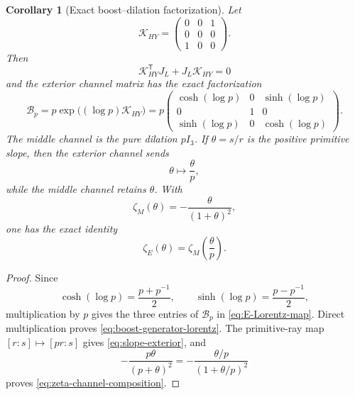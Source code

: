 \documentclass[11pt]{article}
\newtheorem{corollary}[theorem]{Corollary}
\theoremstyle{definition}
\theoremstyle{remark}
\begin{document}
\begin{corollary}[Exact boost--dilation factorization]
\label{cor:boost-dilation}
Let
\begin{equation}\label{eq:boost-generator}
 \mathcal K_{HY}=
 \begin{pmatrix}0&0&1\\0&0&0\\1&0&0\end{pmatrix}.
\end{equation}
Then
\begin{equation}\label{eq:boost-generator-lorentz}
 \mathcal K_{HY}^{\mathsf T}J_L+J_L\mathcal K_{HY}=0
\end{equation}
and the exterior channel matrix has the exact factorization
\begin{equation}\label{eq:boost-factorization}
 \mathcal B_p
 =p\exp\!\bigl((\log p)\mathcal K_{HY}\bigr)
 =p\begin{pmatrix}
 \cosh(\log p)&0&\sinh(\log p)\\
 0&1&0\\
 \sinh(\log p)&0&\cosh(\log p)
 \end{pmatrix}.
\end{equation}
The middle channel is the pure dilation $pI_3$.  If
$\theta=s/r$ is the positive primitive slope, then the exterior channel sends
\begin{equation}\label{eq:slope-exterior}
 \theta\longmapsto\frac{\theta}{p},
\end{equation}
while the middle channel retains $\theta$.  With
\begin{equation}\label{eq:zeta-middle-function}
 \zeta_M(\theta)=-\frac{\theta}{(1+\theta)^2},
\end{equation}
one has the exact identity
\begin{equation}\label{eq:zeta-channel-composition}
 \zeta_E(\theta)=\zeta_M\!\left(\frac{\theta}{p}\right).
\end{equation}
\end{corollary}

\begin{proof}
Since
\[
 \cosh(\log p)=\frac{p+p^{-1}}2,
 \qquad
 \sinh(\log p)=\frac{p-p^{-1}}2,
\]
multiplication by $p$ gives the three entries of $\mathcal B_p$ in
\eqref{eq:E-Lorentz-map}.  Direct multiplication proves
\eqref{eq:boost-generator-lorentz}.  The primitive-ray map
$[r:s]\mapsto[pr:s]$ gives \eqref{eq:slope-exterior}, and
\[
 -\frac{p\theta}{(p+\theta)^2}
 =-\frac{\theta/p}{(1+\theta/p)^2}
\]
proves \eqref{eq:zeta-channel-composition}.
\end{proof}
\end{document}

